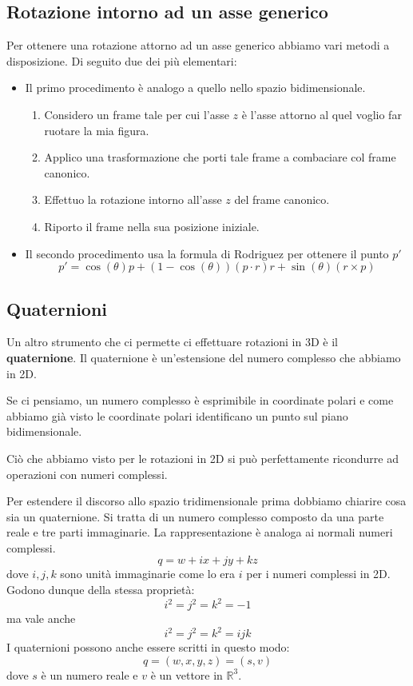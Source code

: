\subsection{Rotazione intorno ad un asse generico}
Per ottenere una rotazione attorno ad un asse generico abbiamo vari metodi a disposizione. Di seguito due dei pi\`u
elementari:
\begin{itemize}
	\item Il primo procedimento \`e analogo a quello nello spazio bidimensionale.
	      \begin{enumerate}
		      \item Considero un frame tale per cui l'asse $z$ \`e l'asse attorno al quel voglio far ruotare la mia
		            figura.
		      \item Applico una trasformazione che porti tale frame a combaciare col frame canonico.
		      \item Effettuo la rotazione intorno all'asse $z$ del frame canonico.
		      \item Riporto il frame nella sua posizione iniziale.
	      \end{enumerate}
	\item Il secondo procedimento usa la formula di Rodriguez per ottenere il punto $p'$
	      \[ p' = \cos(\theta) p + (1 - \cos(\theta))(p \cdot r) r + \sin(\theta)(r \times p) \]
\end{itemize}

\subsection{Quaternioni}
Un altro strumento che ci permette ci effettuare rotazioni in 3D \`e il \textbf{quaternione}. Il quaternione \`e
un'estensione del numero complesso che abbiamo in 2D.

Se ci pensiamo, un numero complesso \`e esprimibile in coordinate polari e come abbiamo gi\`a visto le coordinate polari
identificano un punto sul piano bidimensionale.

Ci\`o che abbiamo visto per le rotazioni in 2D si pu\`o perfettamente ricondurre ad operazioni con numeri complessi.

Per estendere il discorso allo spazio tridimensionale prima dobbiamo chiarire cosa sia un quaternione. Si tratta di un
numero complesso composto da una parte reale e tre parti immaginarie. La rappresentazione \`e analoga ai normali numeri
complessi.
\[ q = w + ix + jy + kz \]
dove $i, j, k$ sono unit\`a immaginarie come lo era $i$ per i numeri complessi in 2D. Godono dunque della stessa
propriet\`a:
\[ i^2 = j^2 = k^2 = -1 \]
ma vale anche
\[ i^2 = j^2 = k^2 = ijk \]
I quaternioni possono anche essere scritti in questo modo:
\[ q = (w, x, y, z) = (s, v) \]
dove $s$ \`e un numero reale e $v$ \`e un vettore in $\mathbb{R}^3$.

